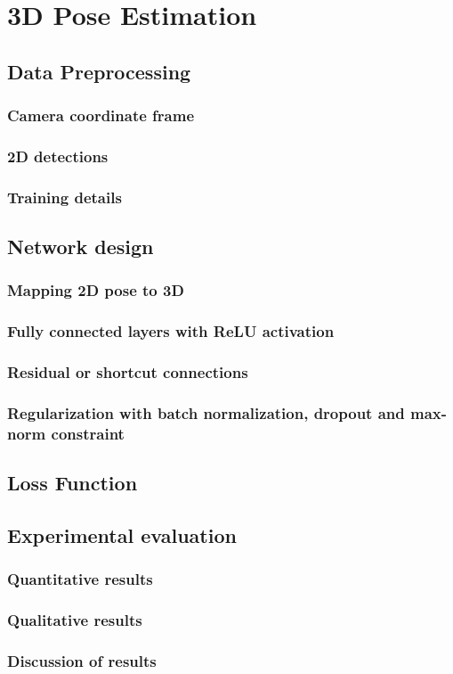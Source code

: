 
\chapter{3D Pose Estimation}\label{chapter:3Dpose}

\section{Data Preprocessing}

\subsection{Camera coordinate frame}
\subsection{2D detections}
\subsection{Training details}

\section{Network design}

\subsection{Mapping 2D pose to 3D}
\subsection{Fully connected layers with ReLU activation}
\subsection{Residual or shortcut connections}
\subsection{Regularization with batch normalization, dropout and
max-norm constraint}

\section{Loss Function}

\section{Experimental evaluation}

\subsection{Quantitative results}
\subsection{Qualitative results}
\subsection{Discussion of results}
